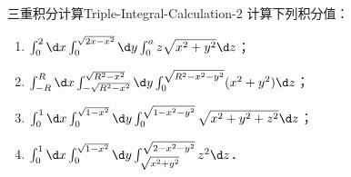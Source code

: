 \begin{problem}{三重积分计算}{Triple-Integral-Calculation-2}
    计算下列积分值：
    \begin{enumerate}
        \item $\int_{0}^{2} \d x \int_{0}^{\sqrt{2x-x^{2}}} \d y \int_{0}^{a} z \sqrt{x^{2}+y^{2}} \d z$；
        \item $\int_{-R}^{R} \d x \int_{-\sqrt{R^{2}-x^{2}}}^{\sqrt{R^{2}-x^{2}}} \d y \int_{0}^{\sqrt{R^{2}-x^{2}-y^{2}}} (x^{2}+y^{2}) \d z$；
        \item $\int_{0}^{1} \d x \int_{0}^{\sqrt{1-x^{2}}} \d y \int_{0}^{\sqrt{1-x^{2}-y^{2}}} \sqrt{x^{2}+y^{2}+z^{2}} \d z$；
        \item $\int_{0}^{1} \d x \int_{0}^{\sqrt{1-x^{2}}} \d y \int_{\sqrt{x^{2}+y^{2}}}^{\sqrt{2-x^{2}-y^{2}}} z^{2} \d z$．
    \end{enumerate}
\end{problem}

